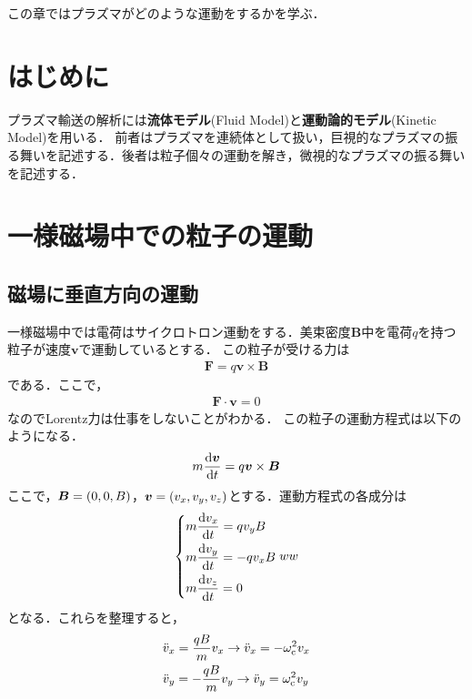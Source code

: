 \documentclass{report}
\begin{document}
  この章ではプラズマがどのような運動をするかを学ぶ．
  \section{はじめに}
    プラズマ輸送の解析には\textbf{流体モデル}(Fluid Model)と\textbf{運動論的モデル}(Kinetic Model)を用いる．
    前者はプラズマを連続体として扱い，巨視的なプラズマの振る舞いを記述する．後者は粒子個々の運動を解き，微視的なプラズマの振る舞いを記述する．
  \section{一様磁場中での粒子の運動}
    \subsection{磁場に垂直方向の運動}
      一様磁場中では電荷はサイクロトロン運動をする．美束密度$\bm{B}$中を電荷$q$を持つ粒子が速度$\bm{v}$で運動しているとする．
      この粒子が受ける力は
      \begin{align}
        \bm{F} = q\bm{v}\times\bm{B}
      \end{align}
      である．ここで，
      \begin{align}
        \bm{F} \cdot \bm{v} = 0
      \end{align}
      なのでLorentz力は仕事をしないことがわかる．
      この粒子の運動方程式は以下のようになる．
      \begin{align}
        m \dv{\bm{v}}{t} = q\bm{v}\times\bm{B}
      \end{align}
      ここで，$\bm{B} = \qty(0, 0, B)$，$\bm{v} = \qty(v_x, v_y, v_z)$とする．運動方程式の各成分は
      \begin{align}
        \begin{dcases}
          m\dv{v_x}{t} = qv_yB \\
          m\dv{v_y}{t} = -qv_xB \\
          m\dv{v_z}{t} = 0
        \end{dcases}ww
      \end{align}
      となる．これらを整理すると，
      \begin{align}
        &\ddot{v}_x = \frac{qB}{m}v_x \to \ddot{v}_x = - \omega_{\mathrm{c}}^2 v_x\\
        &\ddot{v}_y = -\frac{qB}{m}v_y \to \ddot{v}_y = \omega_{\mathrm{c}}^2 v_y
      \end{align}
\end{document}
